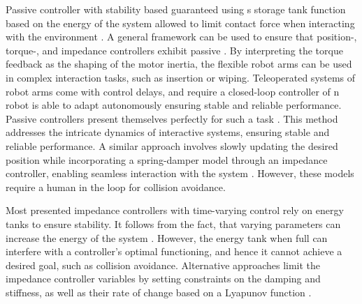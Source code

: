 Passive controller with stability based guaranteed using s storage tank function based on the energy of the system allowed to limit contact force when interacting with the environment \cite{kishi2003passive}.
A general framework can be used to ensure that position-, torque-, and impedance controllers exhibit passive \cite{albu2007unified}. By interpreting the torque feedback as the shaping of the motor inertia, the flexible robot arms can be used in complex interaction tasks, such as insertion or wiping.
Teleoperated systems of robot arms come with control delays, and require a closed-loop controller of n robot is able to adapt autonomously ensuring stable and reliable performance. Passive controllers present themselves perfectly for such a task  \cite{stramigioli2005sampled}. This method addresses the intricate dynamics of interactive systems, ensuring stable and reliable performance.
A similar approach involves slowly updating the desired position while incorporating a spring-damper model through an impedance controller, enabling seamless interaction with the system \cite{lee2010passive}.
However, these models require a human in the loop for collision avoidance.

Most presented impedance controllers with time-varying control rely on energy tanks to ensure stability. 
It follows from the fact, that varying parameters can increase the energy of the system \cite{ferraguti2013tank}. However, the energy tank when full can interfere with a controller's optimal functioning, and hence it cannot achieve a desired goal, such as collision avoidance.
Alternative approaches limit the impedance controller variables  by setting constraints on the damping and stiffness, as well as their rate of change based on a Lyapunov function \cite{kronander2016stability}.

